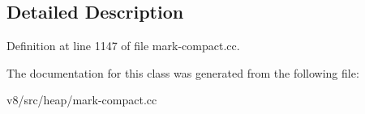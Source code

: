 \subsection{Detailed Description}


Definition at line 1147 of file mark-\/compact.\+cc.



The documentation for this class was generated from the following file\+:\begin{DoxyCompactItemize}
\item 
v8/src/heap/mark-\/compact.\+cc\end{DoxyCompactItemize}

